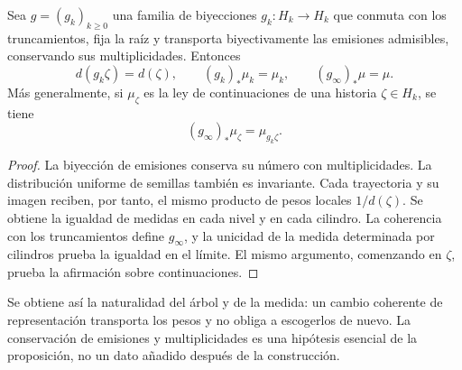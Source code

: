 \begin{proposition}
\label{x_reciprocidad:prop:ch-naturalidad-medida}
Sea \(g=(g_k)_{k\geq0}\) una familia de biyecciones \(g_k:H_k\to H_k\)
que conmuta con los truncamientos, fija la raíz y transporta biyectivamente
las emisiones admisibles, conservando sus multiplicidades. Entonces
\[
 d(g_k\zeta)=d(\zeta),\qquad
 (g_k)_*\mu_k=\mu_k,\qquad (g_\infty)_*\mu=\mu.
\]
Más generalmente, si \(\mu_\zeta\) es la ley de continuaciones de una
historia \(\zeta\in H_k\), se tiene
\[
 (g_\infty)_*\mu_\zeta=\mu_{g_k\zeta}.
\]
\end{proposition}

\begin{proof}
La biyección de emisiones conserva su número con multiplicidades. La
distribución uniforme de semillas también es invariante. Cada trayectoria
y su imagen reciben, por tanto, el mismo producto de pesos locales
\(1/d(\zeta)\). Se obtiene la igualdad de medidas en cada nivel y en
cada cilindro. La coherencia con los truncamientos define \(g_\infty\),
y la unicidad de la medida determinada por cilindros prueba la igualdad
en el límite. El mismo argumento, comenzando en \(\zeta\), prueba la
afirmación sobre continuaciones.
\end{proof}

Se obtiene así la naturalidad del árbol y de la medida: un cambio coherente
de representación transporta los pesos y no obliga a escogerlos de nuevo.
La conservación de emisiones y multiplicidades es una hipótesis esencial de
la proposición, no un dato añadido después de la construcción.

